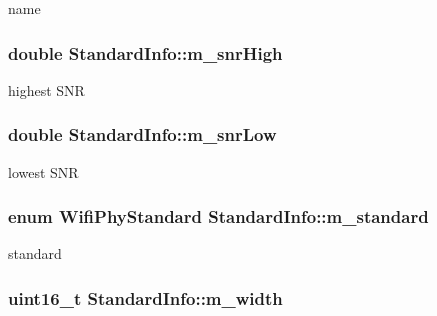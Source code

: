 name 

\subsubsection[{\texorpdfstring{m\+\_\+snr\+High}{m_snrHigh}}]{\setlength{\rightskip}{0pt plus 5cm}double Standard\+Info\+::m\+\_\+snr\+High}\hypertarget{structStandardInfo_a9015b8320c397f26eb0eb0d3758c9efa}{}\label{structStandardInfo_a9015b8320c397f26eb0eb0d3758c9efa}


highest S\+NR 

\subsubsection[{\texorpdfstring{m\+\_\+snr\+Low}{m_snrLow}}]{\setlength{\rightskip}{0pt plus 5cm}double Standard\+Info\+::m\+\_\+snr\+Low}\hypertarget{structStandardInfo_afab2372a0827fa35dfb275bf2a003894}{}\label{structStandardInfo_afab2372a0827fa35dfb275bf2a003894}


lowest S\+NR 

\subsubsection[{\texorpdfstring{m\+\_\+standard}{m_standard}}]{\setlength{\rightskip}{0pt plus 5cm}enum {\bf Wifi\+Phy\+Standard} Standard\+Info\+::m\+\_\+standard}\hypertarget{structStandardInfo_ab7a9f14bfafa7c4a6eb65073bdb28489}{}\label{structStandardInfo_ab7a9f14bfafa7c4a6eb65073bdb28489}


standard 

\subsubsection[{\texorpdfstring{m\+\_\+width}{m_width}}]{\setlength{\rightskip}{0pt plus 5cm}uint16\+\_\+t Standard\+Info\+::m\+\_\+width}\hypertarget{structStandardInfo_a5b3709fd42061dfc2a51115978136abc}{}\label{structStandardInfo_a5b3709fd42061dfc2a51115978136abc}


